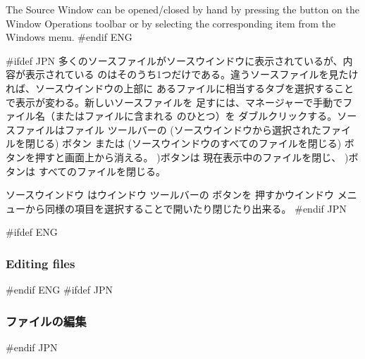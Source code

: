 \documentclass[\pformat,12pt]{article}
\newcommand{\guicmd}[1]{{\sf #1}}
\newcommand{\guicmd}[1]{{\gt #1}}
\begin{document}
The \guicmd{Source Window} can be opened/closed by hand by pressing
the  
button on the \guicmd{Window Operations} toolbar or by
selecting the corresponding item from the \guicmd{Windows} menu.
#endif ENG

#ifdef JPN
多くのソースファイルが\guicmd{ソースウインドウ}に表示されているが、内容が表示されている
のはそのうち1つだけである。違うソースファイルを見たければ、\guicmd{ソースウインドウ}の上部に
あるファイルに相当するタブを選択することで表示が変わる。新しいソースファイルを
足すには、\guicmd{マネージャー}で手動でファイル名（またはファイルに含まれる
 のひとつ）を
ダブルクリックする。ソースファイルは\guicmd{ファイル} ツールバーの 
(\guicmd{ソースウインドウから選択されたファイルを閉じる}) ボタン
または 
(\guicmd{ソースウインドウのすべてのファイルを閉じる}) ボタンを押すと画面上から消える。 
)ボタンは
現在表示中のファイルを閉じ、
)ボタンは
すべてのファイルを閉じる。

\guicmd{ソースウインドウ} は\guicmd{ウインドウ} ツールバーの
ボタンを
押すか\guicmd{ウインドウ} メニューから同様の項目を選択することで開いたり閉じたり出来る。
#endif JPN

#ifdef ENG
\subsubsection{Editing files}
#endif ENG
#ifdef JPN
\subsubsection{ファイルの編集}
#endif JPN
\end{document}
